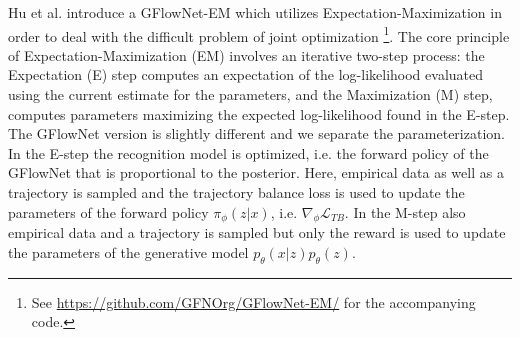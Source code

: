 \subsubsection{}
Hu et al. introduce a GFlowNet-EM which utilizes Expectation-Maximization in order to deal with the difficult problem of joint optimization \cite{hu_gflownet-em_2023} \footnote{See \url{https://github.com/GFNOrg/GFlowNet-EM/} for the accompanying code.}.
The core principle of Expectation-Maximization (EM) involves an iterative two-step process: the Expectation (E) step computes an expectation of the log-likelihood evaluated using the current estimate for the parameters, and the Maximization (M) step, computes parameters maximizing the expected log-likelihood found in the E-step. The GFlowNet version is slightly different and we separate the parameterization.
In the E-step the recognition model is optimized, i.e. the forward policy of the GFlowNet that is proportional to the posterior.
Here, empirical data as well as a trajectory is sampled and the trajectory balance loss is used to update the parameters of the forward policy $\pi_\phi(z|x)$, i.e. $\nabla_\phi \mathcal{L}_{TB}$.
In the M-step also empirical data and a trajectory is sampled but only the reward is used to update the parameters of the generative model $p_\theta(x \vert z) p_\theta(z)$.




